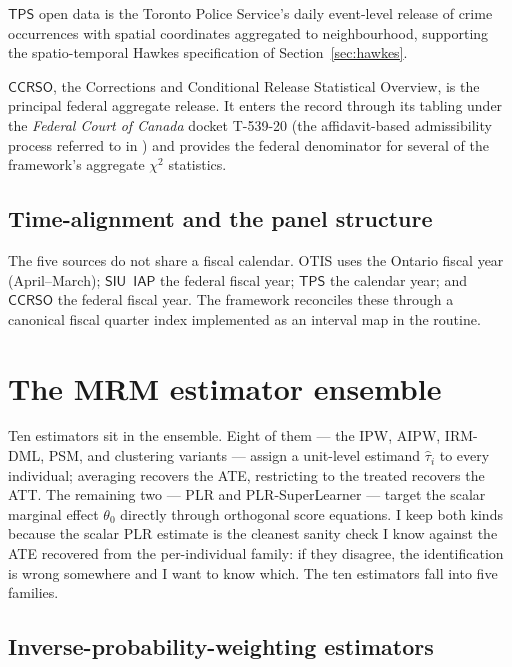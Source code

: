 \documentclass[article,shortnames,nojss]{jss}
\newcommand{\OTIS}{\textsf{OTIS}}
\newcommand{\SIU}{\textsf{SIU}}
\newcommand{\TPS}{\textsf{TPS}}
\newcommand{\CCRSO}{\textsf{CCRSO}}
\newcommand{\IAP}{\textsf{IAP}}
\begin{document}
$\TPS$ open data is the Toronto Police Service's daily event-level
release of crime occurrences with spatial coordinates aggregated to
neighbourhood, supporting the spatio-temporal Hawkes specification
of Section~\ref{sec:hawkes}.

$\CCRSO$, the Corrections and Conditional Release Statistical
Overview, is the principal federal aggregate release. It enters the
record through its tabling under the \emph{Federal Court of Canada}
docket T-539-20 (the affidavit-based admissibility process referred
to in \citealt{Doob2023}) and provides the federal denominator for
several of the framework's aggregate $\chi^{2}$ statistics.

\subsection{Time-alignment and the panel structure}

The five sources do not share a fiscal calendar.
\OTIS{} uses the Ontario fiscal year (April--March); $\SIU$~$\IAP$
the federal fiscal year; $\TPS$ the calendar year; and $\CCRSO$ the
federal fiscal year. The framework reconciles these through a
canonical fiscal quarter index implemented as an interval map in
the  routine.

\section{The MRM estimator ensemble}
\label{sec:per-individual}

Ten estimators sit in the ensemble. Eight of them --- the IPW,
AIPW, IRM-DML, PSM, and clustering variants --- assign a
unit-level estimand $\hat{\tau}_i$ to every individual;
averaging recovers the ATE, restricting to the treated recovers
the ATT. The remaining two --- PLR and PLR-SuperLearner ---
target the scalar marginal effect $\theta_0$ directly through
orthogonal score equations. I keep both kinds because the
scalar PLR estimate is the cleanest sanity check I know against
the ATE recovered from the per-individual family: if they
disagree, the identification is wrong somewhere and I want to
know which. The ten estimators fall into five families.

\subsection{Inverse-probability-weighting estimators}
\label{sec:ipw}
\end{document}
